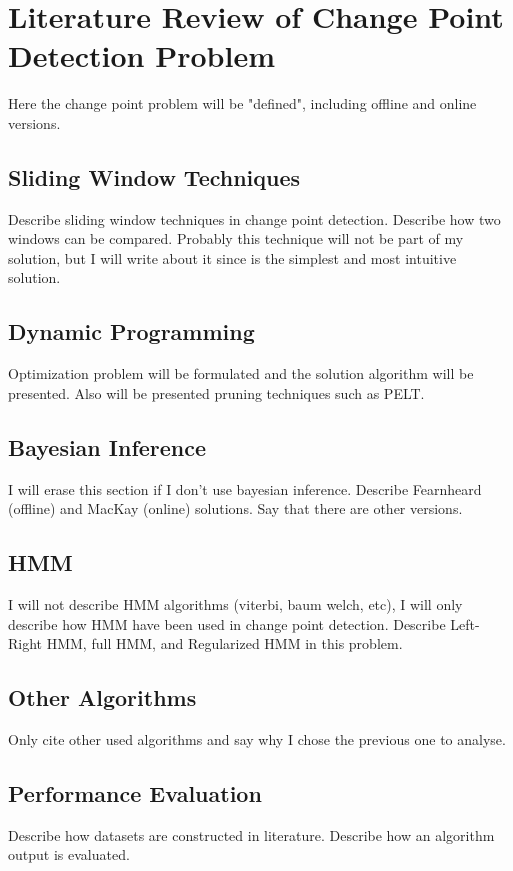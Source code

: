 \chapter{Literature Review of Change Point Detection Problem}

Here the change point problem will be "defined", including offline and online versions.

\section{Sliding Window Techniques}
Describe sliding window techniques in change point detection. Describe how two windows can be compared. Probably this technique will not be part of my solution, but I will write about it since is the simplest and most intuitive solution.

\section{Dynamic Programming}  
Optimization problem will be formulated and the solution algorithm will be presented. Also will be presented pruning techniques such as PELT.

\section{Bayesian Inference}
I will erase this section if I don't use bayesian inference. Describe Fearnheard (offline) and MacKay (online) solutions. Say that there are other versions.

\section{HMM}
I will not describe HMM algorithms (viterbi, baum welch, etc), I will only describe how HMM have been used in change point detection. Describe Left-Right HMM, full HMM, and Regularized HMM in this problem.

\section{Other Algorithms}
Only cite other used algorithms and say why I chose the previous one to analyse.

\section{Performance Evaluation}
  Describe how datasets are constructed in literature. Describe how an algorithm output is evaluated.

